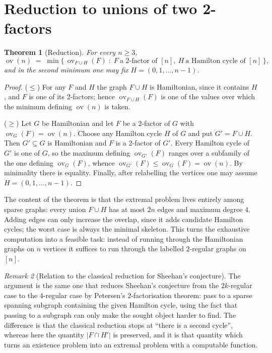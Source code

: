 \documentclass[11pt,a4paper]{article}
\newtheorem{theorem}{Theorem}[section]
\theoremstyle{definition}
\theoremstyle{remark}
\newtheorem{remark}[theorem]{Remark}
\newcommand{\ov}{\operatorname{ov}}
\begin{document}
\section{Reduction to unions of two 2-factors}\label{sec:reduction}

\begin{theorem}[Reduction]\label{thm:reduction}
For every $n\ge3$,
\[
\ov(n)\;=\;\min\bigl\{\,\ov_{F\cup H}(F)\;:\;F\ \text{a 2-factor of }[n],\
H\ \text{a Hamilton cycle of }[n]\,\bigr\},
\]
and in the second minimum one may fix $H=(0,1,\dots,n-1)$.
\end{theorem}

\begin{proof}
($\le$) For any $F$ and $H$ the graph $F\cup H$ is Hamiltonian, since it contains $H$, and $F$ is one of its 2-factors; hence $\ov_{F\cup H}(F)$ is one of the values over which the minimum defining $\ov(n)$ is taken.

($\ge$) Let $G$ be Hamiltonian and let $F$ be a 2-factor of $G$ with $\ov_G(F)=\ov(n)$. Choose any Hamilton cycle $H$ of $G$ and put $G'=F\cup H$. Then $G'\subseteq G$ is Hamiltonian and $F$ is a 2-factor of $G'$. Every Hamilton cycle of $G'$ is one of $G$, so the maximum defining $\ov_{G'}(F)$ ranges over a subfamily of the one defining $\ov_G(F)$, whence $\ov_{G'}(F)\le\ov_G(F)=\ov(n)$. By minimality there is equality. Finally, after relabelling the vertices one may assume $H=(0,1,\dots,n-1)$.
\end{proof}

The content of the theorem is that the extremal problem lives entirely among sparse graphs: every union $F\cup H$ has at most $2n$ edges and maximum degree $4$. Adding edges can only increase the overlap, since it adds candidate Hamilton cycles; the worst case is always the minimal skeleton. This turns the exhaustive computation into a feasible task: instead of running through the Hamiltonian graphs on $n$ vertices it suffices to run through the labelled $2$-regular graphs on $[n]$.

\begin{remark}[Relation to the classical reduction for Sheehan's conjecture]\label{rem:classical}
The argument is the same one that reduces Sheehan's conjecture from the $2k$-regular case to the $4$-regular case by Petersen's $2$-factorisation theorem: pass to a sparse spanning subgraph containing the given Hamilton cycle, using the fact that passing to a subgraph can only make the sought object harder to find. The difference is that the classical reduction stops at ``there is a second cycle'', whereas here the quantity $|F\cap H'|$ is preserved, and it is that quantity which turns an existence problem into an extremal problem with a computable function.
\end{remark}
\end{document}
